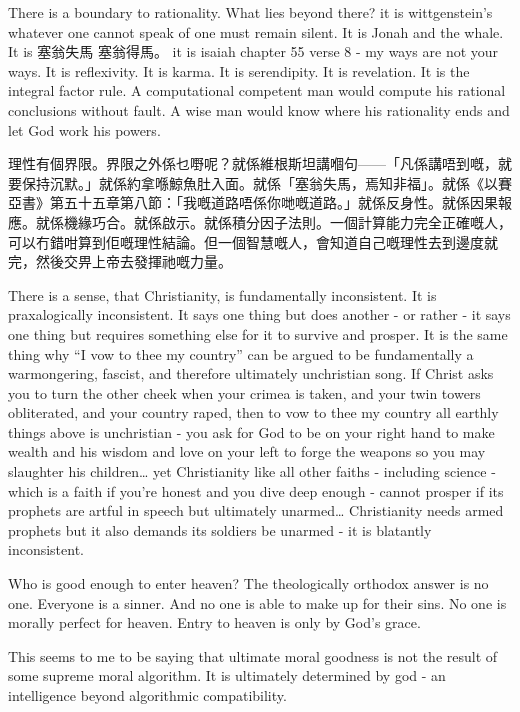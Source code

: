 There is a boundary to rationality. What lies beyond there? it is wittgenstein’s whatever one cannot speak of one must remain silent. It is Jonah and the whale. It is 塞翁失馬 塞翁得馬。 it is isaiah chapter 55 verse 8 - my ways are not your ways. It is reflexivity. It is karma. It is serendipity. It is revelation. It is the integral factor rule. A computational competent man would compute his rational conclusions without fault. A wise man would know where his rationality ends and let God work his powers. 


理性有個界限。界限之外係乜嘢呢？就係維根斯坦講嗰句——「凡係講唔到嘅，就要保持沉默。」就係約拿喺鯨魚肚入面。就係「塞翁失馬，焉知非福」。就係《以賽亞書》第五十五章第八節：「我嘅道路唔係你哋嘅道路。」就係反身性。就係因果報應。就係機緣巧合。就係啟示。就係積分因子法則。一個計算能力完全正確嘅人，可以冇錯咁算到佢嘅理性結論。但一個智慧嘅人，會知道自己嘅理性去到邊度就完，然後交畀上帝去發揮祂嘅力量。



There is a sense, that Christianity, is fundamentally inconsistent. It is praxalogically inconsistent. It says one thing but does another - or rather - it says one thing but requires something else for it to survive and prosper. It is the same thing why “I vow to thee my country” can be argued to be fundamentally a warmongering, fascist, and therefore ultimately unchristian song. If Christ asks you to turn the other cheek when your crimea is taken, and your twin towers obliterated, and your country raped, then to vow to thee my country all earthly things above is unchristian - you ask for God to be on your right hand to make wealth and his wisdom and love on your left to forge the weapons so you may slaughter his children… yet Christianity like all other faiths - including science - which is a faith if you’re honest and you dive deep enough - cannot prosper if its prophets are artful in speech but ultimately unarmed… Christianity needs armed prophets but it also demands its soldiers be unarmed - it is blatantly inconsistent. 


Who is good enough to enter heaven? The theologically orthodox answer is no one. Everyone is a sinner. And no one is able to make up for their sins. No one is morally perfect for heaven. Entry to heaven is only by God’s grace. 

This seems to me to be saying that ultimate moral goodness is not the result of some supreme moral algorithm. It is ultimately determined by god - an intelligence beyond algorithmic compatibility. 



